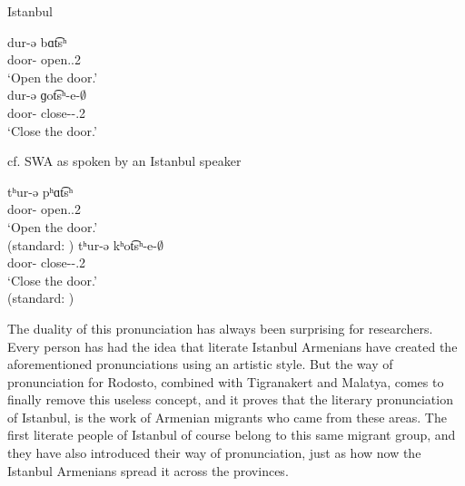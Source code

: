 \begin{exe}
	\ex \begin{xlist}
		\ex Istanbul \label{sent:Rodosto:phono:change:cons:voice:Istanbul}
		\begin{xlist}
			\ex \gll dur-ə bɑt͡sʰ \\
			door-{} open.{\imp}.2{\sg} \\
			\trans `Open the door.'\\
			\ex \gll dur-ə ɡot͡sʰ-e-$\emptyset$ \\
			door-{} close-{\thgloss}-{\imp}.2{\sg} \\
			\trans `Close the door.'\\
		\end{xlist}
		\ex cf. SWA as spoken by an Istanbul speaker \label{sent:Rodosto:phono:change:cons:voice:swa}
		\begin{xlist}
			\ex \gll tʰur-ə pʰɑt͡sʰ \\
			door-{} open.{\imp}.2{\sg} \\
			\trans `Open the door.'\\
			 (standard: \armenian{դուռը բաց})
			\ex \gll tʰur-ə kʰot͡sʰ-e-$\emptyset$ \\
			door-{} close-{\thgloss}-{\imp}.2{\sg} \\
			\trans `Close the door.'\\
			 (standard: \armenian{դուռը գոցէ})
		\end{xlist}

	\end{xlist}
	
\end{exe}


 

The duality of this pronunciation has always been surprising for researchers. Every person has had the idea that literate Istanbul Armenians have created the aforementioned pronunciations using an artistic style. But the way of pronunciation for Rodosto, combined with Tigranakert and Malatya, comes to finally remove this useless concept, and it proves that the literary pronunciation of Istanbul, is the work of Armenian migrants who came from these areas. The first literate people of Istanbul of course belong to this same migrant group, and they have also introduced their way of pronunciation, just as how now the Istanbul Armenians spread it across the provinces.


